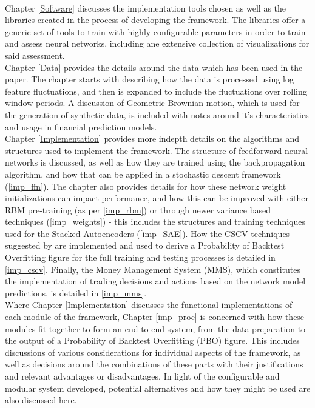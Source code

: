 \documentclass[a4paper,11pt,oneside]{article}
\theoremstyle{plain}
\theoremstyle{definition}
\begin{document}
	~\\\newline
	Chapter \ref{Software} discusses the implementation tools chosen as well as the libraries created in the process of developing the framework. The libraries offer a generic set of tools to train with highly configurable parameters in order to train and assess neural networks, including ane extensive collection of visualizations for said assessment.
	~\\\newline
	Chapter \ref{Data} provides the details around the data which has been used in the paper. The chapter starts with describing how the data is processed using log feature fluctuations, and then is expanded to include the fluctuations over rolling window periods. A discussion of Geometric Brownian motion, which is used for the generation of synthetic data, is included with notes around it's characteristics and usage in financial prediction models.
	~\\\newline
	Chapter \ref{Implementation} provides more indepth details on the algorithms and structures used to implement the framework. The structure of feedforward neural networks is discussed, as well as how they are trained using the backpropagation algorithm, and how that can be applied in a stochastic descent framework (\ref{imp_ffn}). The chapter also provides details for how these network weight initializations can impact performance, and how this can be improved with either RBM pre-training (as per \ref{imp_rbm}) or through newer variance based techniques (\ref{imp_weights}) - this includes the structures and training techniques used for the Stacked Autoencoders (\ref{imp_SAE}). How the CSCV techniques suggested by \cite{BailyPBO} are implemented and used to derive a Probability of Backtest Overfitting figure for the full training and testing processes is detailed in \ref{imp_cscv}. Finally, the Money Management System (MMS), which constitutes the implementation of trading decisions and actions based on the network model predictions, is detailed in \ref{imp_mms}.
	~\\\newline
	Where Chapter \ref{Implementation} discusses the functional implementations of each module of the framework, Chapter \ref{imp_proc} is concerned with how these modules fit together to form an end to end system, from the data preparation to the output of a Probability of Backtest Overfitting (PBO) figure. This includes discussions of various considerations for individual aspects of the framework, as well as decisions around the combinations of these parts with their justifications and relevant advantages or disadvantages. In light of the configurable and modular system developed, potential alternatives and how they might be used are also discussed here.
\end{document}
